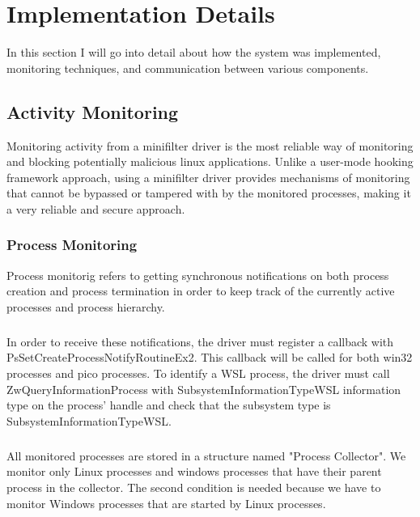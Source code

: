 \chapter{Implementation Details}
    In this section I will go into detail about how the system was implemented, monitoring techniques, and communication between various
    components.

    \section{Activity Monitoring}

    Monitoring activity from a minifilter driver is the most reliable way of monitoring and blocking potentially malicious linux applications.
    Unlike a user-mode hooking framework approach, using a minifilter driver provides mechanisms of monitoring that cannot be bypassed or tampered
    with by the monitored processes, making it a very reliable and secure approach.

    \subsection{Process Monitoring}
        Process monitorig refers to getting synchronous notifications on both process creation and process termination in order to keep track
        of the currently active processes and process hierarchy.

        \paragraph{}
        In order to receive these notifications, the driver must register a callback with PsSetCreateProcessNotifyRoutineEx2. This callback will
        be called for both win32 processes and pico processes. To identify a WSL process, the driver must call ZwQueryInformationProcess with
        SubsystemInformationTypeWSL information type on the process' handle and check that the subsystem type is SubsystemInformationTypeWSL.

        \paragraph{}
        All monitored processes are stored in a structure named "Process Collector". We monitor only Linux processes and windows processes that
        have their parent process in the collector. The second condition is needed because we have to monitor Windows processes that are started
        by Linux processes.

